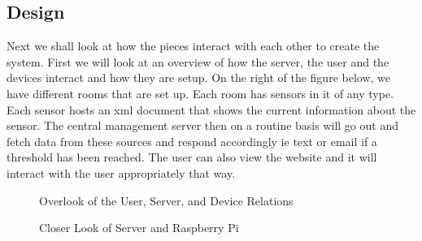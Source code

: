 \documentclass{report}
\begin{document}
\subsection*{Design}
\indent
\indent
Next we shall look at how the pieces interact with each other to create the system. First we will look at an overview of how the server, the user and the devices interact and how they are setup. 
\newline
\indent
On the right of the figure below, we have different rooms that are set up. Each room has sensors in it of any type. Each sensor hosts an xml document that shows the current information about the sensor. The central management server then on a routine basis will go out and fetch data from these sources and respond accordingly ie text or email if a threshold has been reached. The user can also view the website and it will interact with the user appropriately that way.
\begin{figure}[H]
	\caption{Overlook of the User, Server, and Device Relations}
\end{figure}
\begin{figure}[H]
	\caption{Closer Look of Server and Raspberry Pi}
\end{figure}
\end{document}
